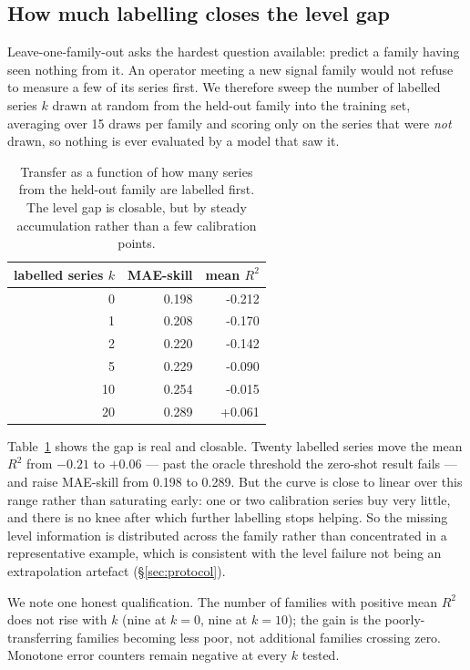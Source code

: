 \documentclass[11pt,a4paper]{article}
\newcommand{\num}[1]{#1}
\begin{document}
\subsection{How much labelling closes the level gap}
\label{sec:fewshot}

Leave-one-family-out asks the hardest question available: predict a family
having seen nothing from it. An operator meeting a new signal family would not
refuse to measure a few of its series first. We therefore sweep the number of
labelled series \(k\) drawn at random from the held-out family into the training
set, averaging over \num{15} draws per family and scoring only on the series
that were \emph{not} drawn, so nothing is ever evaluated by a model that saw it.

\begin{table}[t]
\centering
\caption{Transfer as a function of how many series from the held-out family are
labelled first. The level gap is closable, but by steady accumulation rather
than a few calibration points.}
\label{tab:fewshot}
\small
\begin{tabular}{rrr}
\toprule
labelled series \(k\) & MAE-skill & mean \(R^2\) \\
\midrule
0  & \num{0.198} & \num{-0.212} \\
1  & \num{0.208} & \num{-0.170} \\
2  & \num{0.220} & \num{-0.142} \\
5  & \num{0.229} & \num{-0.090} \\
10 & \num{0.254} & \num{-0.015} \\
20 & \num{0.289} & \num{+0.061} \\
\bottomrule
\end{tabular}
\end{table}

Table~\ref{tab:fewshot} shows the gap is real and closable. Twenty labelled
series move the mean \(R^2\) from \(-0.21\) to \(+0.06\) --- past the oracle
threshold the zero-shot result fails --- and raise MAE-skill from \num{0.198} to
\num{0.289}. But the curve is close to linear over this range rather than
saturating early: one or two calibration series buy very little, and there is no
knee after which further labelling stops helping. So the missing level
information is distributed across the family rather than concentrated in a
representative example, which is consistent with the level failure not being an
extrapolation artefact (\S\ref{sec:protocol}).

We note one honest qualification. The number of families with positive mean
\(R^2\) does not rise with \(k\) (nine at \(k=0\), nine at \(k=10\)); the gain
is the poorly-transferring families becoming less poor, not additional families
crossing zero. Monotone error counters remain negative at every \(k\) tested.
\end{document}

